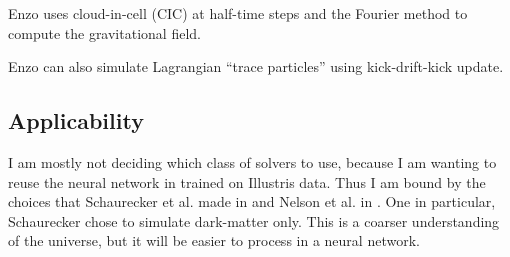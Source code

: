 Enzo uses cloud-in-cell (CIC) at half-time steps and the Fourier method to compute the gravitational field.

Enzo can also simulate Lagrangian ``trace particles'' using kick-drift-kick update.

\subsection*{Applicability}

I am mostly not deciding which class of solvers to use, because I am wanting to reuse the neural network in \cite{schaurecker_super-resolving_2021} trained on Illustris data. Thus I am bound by the choices that Schaurecker et al. made in \cite{schaurecker_super-resolving_2021} and Nelson et al. in \cite{nelson_illustris_2015,vogelsberger_introducing_2014}. One in particular, Schaurecker chose to simulate dark-matter only. This is a coarser understanding of the universe, but it will be easier to process in a neural network.
